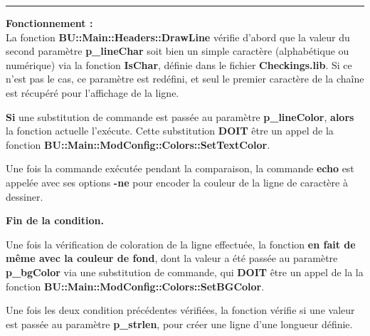 \documentclass[a4paper,10pt]{article}
\begin{document}
\par\noindent\rule{\textwidth}{0.4pt}

\begin{justify}
    \textbf{Fonctionnement :}\\
    La fonction \textbf{\color{mauve}BU::Main::Headers::DrawLine} vérifie d'abord que la valeur du second paramètre \textbf{\color{orange}p\_lineChar} soit bien un simple caractère (alphabétique ou numérique) via la fonction \textbf{\color{mauve}IsChar}, définie dans le fichier \textbf{\color{lime}Checkings.lib}. Si ce n'est pas le cas, ce paramètre est redéfini, et seul le premier caractère de la chaîne est récupéré pour l'affichage de la ligne.
\end{justify}

\begin{justify}
    \textbf{\color{brick}Si} une substitution de commande est passée au paramètre \textbf{\color{orange}p\_lineColor}, \textbf{\color{brick}alors} la fonction actuelle l'exécute. Cette substitution \textbf{DOIT} être un appel de la fonction \textbf{\color{mauve}BU::Main::ModConfig::Colors::SetTextColor}.
\end{justify}

\begin{justify}
    Une fois la commande exécutée pendant la comparaison, la commande \textbf{\color{gray}echo} est appelée avec ses options \textbf{\color{gray}-ne} pour encoder la couleur de la ligne de caractère à dessiner.
\end{justify}

\begin{justify}
    \textbf{\color{brick}Fin de la condition.}\\
\end{justify}


\begin{justify}
    Une fois la vérification de coloration de la ligne effectuée, la fonction \textbf{\color{brick}en fait de même avec la couleur de fond}, dont la valeur a été passée au paramètre \textbf{\color{orange}p\_bgColor} via une substitution de commande, qui \textbf{DOIT} être un appel de la la fonction \textbf{\color{mauve}BU::Main::ModConfig::Colors::SetBGColor}.
\end{justify}

\begin{justify}
    Une fois les deux condition précédentes vérifiées, la fonction vérifie si une valeur est passée au paramètre \textbf{\color{orange}p\_strlen}, pour créer une ligne d'une longueur définie.
\end{justify}
\end{document}
